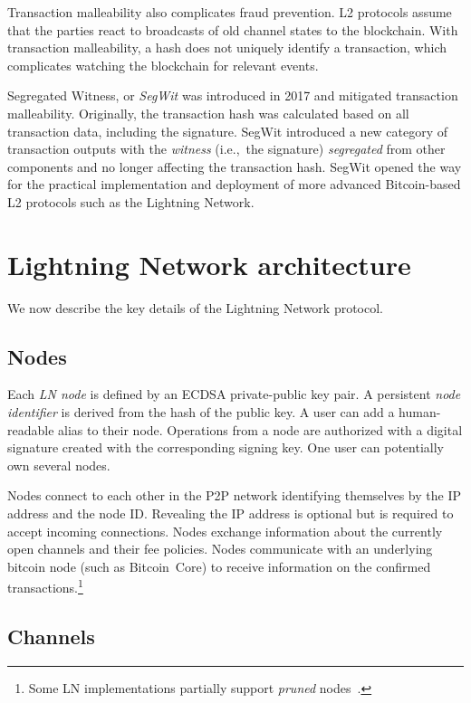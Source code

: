 Transaction malleability also complicates fraud prevention.
L2 protocols assume that the parties react to broadcasts of old channel states to the blockchain.
With transaction malleability, a hash does not uniquely identify a transaction, which complicates watching the blockchain for relevant events.

Segregated Witness, or \textit{SegWit} was introduced in 2017 and mitigated transaction malleability.
Originally, the transaction hash was calculated based on all transaction data, including the signature.
SegWit introduced a new category of transaction outputs with the \textit{witness} (i.e.,~the signature) \textit{segregated} from other components and no longer affecting the transaction hash.
SegWit opened the way for the practical implementation and deployment of more advanced Bitcoin-based L2 protocols such as the Lightning Network.


\section{Lightning Network architecture}
\label{sec:LightningOverview}

We now describe the key details of the Lightning Network protocol.

\subsection{Nodes}

Each \textit{LN node} is defined by an ECDSA private-public key pair.
A persistent \textit{node identifier} is derived from the hash of the public key. 
A user can add a human-readable alias to their node.
Operations from a node are authorized with a digital signature created with the corresponding signing key.
One user can potentially own several nodes.

Nodes connect to each other in the P2P network identifying themselves by the IP address and the node ID\@.
Revealing the IP address is optional but is required to accept incoming connections.
Nodes exchange information about the currently open channels and their fee policies.
Nodes communicate with an underlying bitcoin node (such as Bitcoin~Core) to receive information on the confirmed transactions.\footnote{Some LN implementations partially support \textit{pruned} nodes~\cite{LNDInstall}.}


\subsection{Channels}

